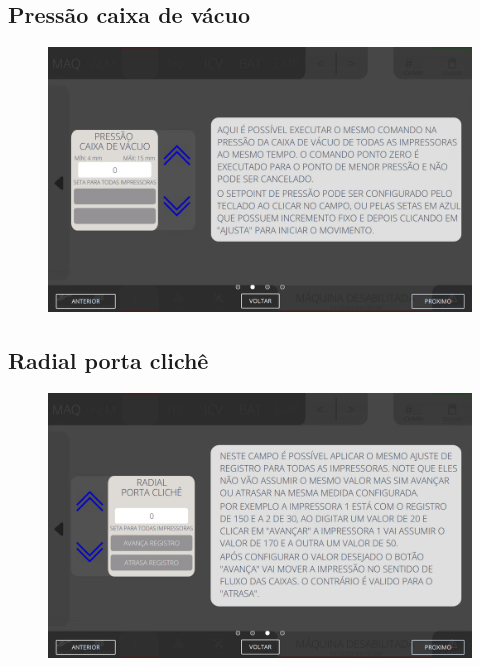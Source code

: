 \subsection{Pressão caixa de vácuo}
\begin{figure}
    \centering
    \includegraphics[width=576 px,height=360 px]{src/imagesICV/04-printters/01-printters/settings/11.png}
\end{figure}
\newpage
\thispagestyle{fancy}
\vspace{\fill}

\subsection{Radial porta clichê}
\begin{figure}
    \centering
    \includegraphics[width=576 px,height=360 px]{src/imagesICV/04-printters/01-printters/settings/12.png}
\end{figure}
\newpage
\thispagestyle{fancy}
\vspace{\fill}

